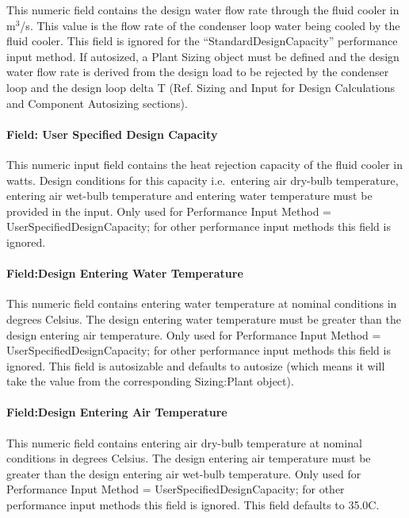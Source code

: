 This numeric field contains the design water flow rate through the fluid cooler in m\(^{3}\)/s. This value is the flow rate of the condenser loop water being cooled by the fluid cooler. This field is ignored for the ``StandardDesignCapacity'' performance input method. If autosized, a Plant Sizing object must be defined and the design water flow rate is derived from the design load to be rejected by the condenser loop and the design loop delta T (Ref. Sizing and Input for Design Calculations and Component Autosizing sections).

\paragraph{Field: User Specified Design Capacity}\label{field-user-specified-design-capacity}

This numeric input field contains the heat rejection capacity of the fluid cooler in watts. Design conditions for this capacity i.e.~entering air dry-bulb temperature, entering air wet-bulb temperature and entering water temperature must be provided in the input. Only used for Performance Input Method = UserSpecifiedDesignCapacity; for other performance input methods this field is ignored.

\paragraph{Field:Design Entering Water Temperature}\label{fielddesign-entering-water-temperature}

This numeric field contains entering water temperature at nominal conditions in degrees Celsius. The design entering water temperature must be greater than the design entering air temperature. Only used for Performance Input Method = UserSpecifiedDesignCapacity; for other performance input methods this field is ignored. This field is autosizable and defaults to autosize (which means it will take the value from the corresponding Sizing:Plant object).

\paragraph{Field:Design Entering Air Temperature}\label{fielddesign-entering-air-temperature}

This numeric field contains entering air dry-bulb temperature at nominal conditions in degrees Celsius. The design entering air temperature must be greater than the design entering air wet-bulb temperature. Only used for Performance Input Method = UserSpecifiedDesignCapacity; for other performance input methods this field is ignored.  This field defaults to 35.0C.


